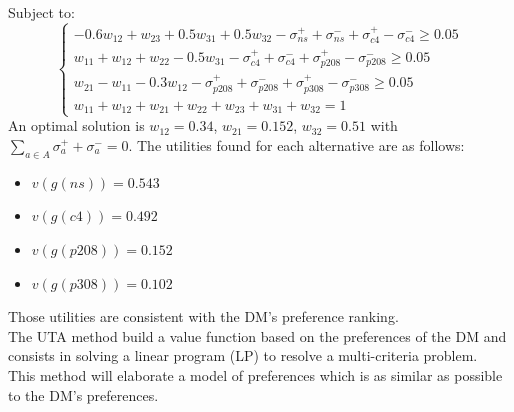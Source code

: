 \documentclass{report}
\begin{document}
Subject to: \\
\begin{equation}
\begin{cases}
-0.6w_{12} + w_{23} + 0.5w_{31} + 0.5w_{32} -\sigma _{ns}^{+} +\sigma _{ns}^{-} +\sigma _{c4}^{+} - \sigma _{c4}^{-} \geq 0.05\\
w_{11} + w_{12} + w_{22} - 0.5w_{31} -\sigma _{c4}^{+} +\sigma _{c4}^{-} +\sigma _{p208}^{+} - \sigma _{p208}^{-} \geq 0.05 \\
w_{21} - w_{11} - 0.3w_{12} -\sigma _{p208}^{+} +\sigma _{p208}^{-} +\sigma _{p308}^{+} - \sigma _{p308}^{-} \geq 0.05 \\
w_{11} + w_{12} + w_{21} + w_{22} + w_{23} + w_{31} + w_{32} = 1
\end{cases}
\end{equation}
An optimal solution is $w_{12} = 0.34$, $w_{21} = 0.152$, $w_{32} = 0.51$ with $\sum_{a \in A} \sigma _{a}^{+} + \sigma _{a}^{-} = 0$. The utilities found for each alternative are as follows: \\ 
\begin{itemize}
\item $v(g(ns)) = 0.543$
\item $v(g(c4)) = 0.492$
\item $v(g(p208)) = 0.152 $
\item $v(g(p308)) = 0.102 $
\end{itemize}
Those utilities are consistent with the DM's preference ranking. \\

The UTA method build a value function based on the preferences of the DM and consists in solving a linear program (LP) to resolve a multi-criteria problem.\\
This method will elaborate a model of preferences which is as similar as possible to the DM's preferences.\\
\end{document}
